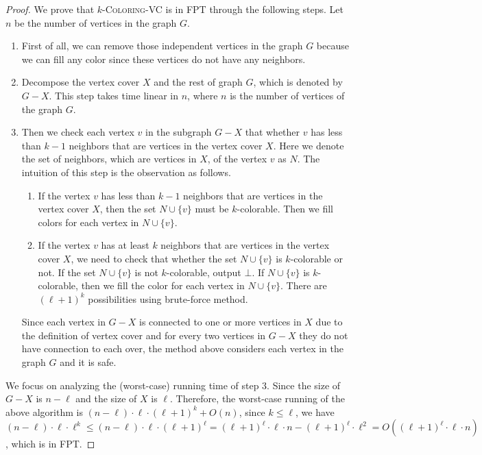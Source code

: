 \documentclass{article}
\newcommand{\pname}[1]{\textnormal{\textsc{#1}}}
\begin{document}
\begin{proof}
We prove that \(k\)-\pname{Coloring-VC} is in FPT through the following steps. Let \(n\) be the number of vertices in the graph \(G\). 
\begin{enumerate}
\item First of all, we can remove those independent vertices in the graph \(G\) because we can fill any color since these vertices do not have any neighbors. 
\item Decompose the vertex cover \(X\) and the rest of graph \(G\), which is denoted by \(G-X\). This step takes time linear in \(n\), where \(n\) is the number of vertices of the graph \(G\). 
\item Then we check each vertex \(v\) in the subgraph \(G-X\) that whether \(v\) has less than \(k-1\) neighbors that are vertices in the vertex cover \(X\). Here we denote the set of neighbors, which are vertices in \(X\), of the vertex \(v\) as \(N\). The intuition of this step is the observation as follows.
    \begin{enumerate}
    \item If the vertex \(v\) has less than \(k-1\) neighbors that are vertices in the vertex cover \(X\), then the set \(N \cup \{v\}\) must be \(k\)-colorable. Then we fill colors for each vertex in \(N \cup \{v\}\).
    \item If the vertex \(v\) has at least \(k\) neighbors that are vertices in the vertex cover \(X\), we need to check that whether the set \(N \cup \{v\}\) is \(k\)-colorable or not. If the set \(N \cup \{v\}\) is not \(k\)-colorable, output \(\bot\). If \(N \cup \{v\}\) is \(k\)-colorable, then we fill the color for each vertex in \(N \cup \{v\}\). There are \((\ell+1)^k\) possibilities using brute-force method. 
    \end{enumerate}
    Since each vertex in \(G-X\) is connected to one or more vertices in \(X\) due to the definition of vertex cover and for every two vertices in \(G-X\) they do not have connection to each over, the method above considers each vertex in the graph \(G\) and it is safe.
\end{enumerate}
We focus on analyzing the (worst-case) running time of step 3. Since the size of \(G-X\) is \(n-\ell\) and the size of \(X\) is \(\ell\). Therefore, the worst-case running of the above algorithm is \((n-\ell)\cdot \ell \cdot (\ell+1)^k + O(n)\), since \(k \leq \ell\), we have \((n-\ell) \cdot \ell \cdot \ell^k \leq (n-\ell) \cdot \ell \cdot (\ell+1)^\ell = (\ell+1)^\ell \cdot \ell \cdot n - (\ell+1)^\ell \cdot \ell^2 = O((\ell+1)^\ell \cdot \ell \cdot n)\), which is in FPT.




\end{proof}
\end{document}
